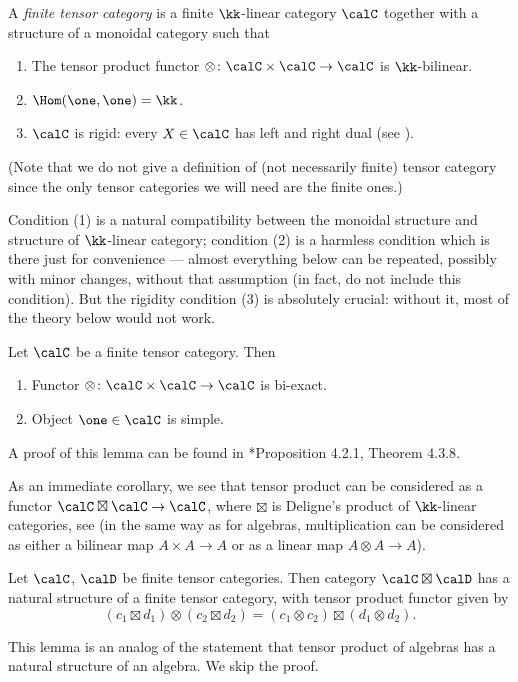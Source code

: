 \begin{definition}\label{d:finite-tensor}
  A \emph{finite tensor category} is a finite $\kk$-linear category $\calC$
  together with a structure of a monoidal category such that
  \begin{enumerate}
    \item The tensor product functor $\otimes\colon
     \calC\times \calC\to \calC$ is $\kk$-bilinear.
    \item $\Hom(\one, \one)=\kk$.
    \item $\calC$ is rigid: every $X\in \calC$ has left and right dual (see
      ).
  \end{enumerate}
\end{definition}
(Note that we do not give a definition of (not necessarily finite) tensor
category since the only tensor categories we will need are the finite ones.)

Condition (1) is a natural compatibility between the monoidal structure and
structure of $\kk$-linear category; condition (2) is a harmless condition which
is there just for convenience --- almost everything below can be repeated,
possibly with minor changes, without that assumption (in fact,
 do not include this condition). But the rigidity condition
(3) is absolutely crucial: without it, most of the theory below would not work.


\begin{lemma}\label{l:tensor-biexact}
  Let $\calC$ be a finite tensor category. Then
  \begin{enumerate}
    \item Functor $\otimes \colon \calC\times \calC\to \calC$ is bi-exact.
    \item Object $\one\in \calC$ is simple.
  \end{enumerate}
\end{lemma}
A proof of this lemma can be found in *{Proposition
4.2.1, Theorem 4.3.8}.

As an immediate corollary, we see that tensor product can be considered as a
functor $\calC\boxtimes \calC\to \calC$, where $\boxtimes$ is Deligne's product
of $\kk$-linear categories, see  (in the same way as
for algebras, multiplication can be considered as either a bilinear map $A\times
A\to A$ or as a linear map $A\otimes A\to A$).

\begin{lemma}\label{l:tensor-boxtimes}
  Let $\calC$, $\calD$ be finite tensor categories. Then category
  $\calC\boxtimes \calD$ has a natural structure of a finite tensor category,
  with tensor product functor given by
  $$
  (c_1 \boxtimes d_1)\otimes (c_2\boxtimes d_2)
    = (c_1\otimes c_2)\boxtimes (d_1\otimes d_2).
  $$
\end{lemma}
This lemma is an analog of the statement that tensor product of algebras has a
natural structure of an algebra. We skip the proof.

